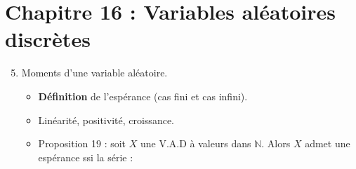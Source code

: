 \documentclass[twoside,a4paper,french,10pt]{VcCours}
\begin{document}
\section*{Chapitre 16 : Variables aléatoires discrètes}
  \begin{enumerate}
  \setcounter{enumi}{4}
  \item Moments d'une variable aléatoire.
  \begin{itemize}
  \item \textbf{Définition} de l'espérance (cas fini et cas infini).
  \item Linéarité, positivité, croissance.
  \item Proposition 19 : soit $X$ une V.A.D à valeurs dans $\mathbb{N}$. Alors $X$ admet une espérance ssi la série :
  

\end{itemize}
\end{enumerate}
\end{document}

